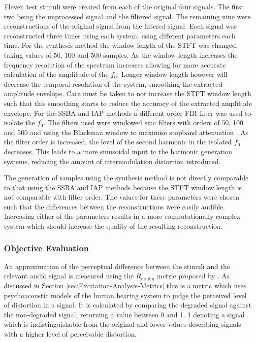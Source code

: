 			Eleven test stimuli were created from each of the original four signals. The first two being the
			unprocessed signal and the filtered signal. The remaining nine were reconstructions of the original
			signal from the filtered signal. Each signal was reconstructed three times using each system, using
			different parameters each time. For the synthesis method the window length of the STFT was changed,
			taking values of 50, 100 and 500 samples. As the window length increases the frequency resolution
			of the spectrum increases allowing for more accurate calculation of the amplitude of the $f_{0}$.
			Longer window length however will decrease the temporal resolution of the system, smoothing the
			extracted amplitude envelope. Care must be taken to not increase the STFT window length such that
			this smoothing starts to reduce the accuracy of the extracted amplitude envelope.  For the SSBA and
			IAP methods a different order FIR filter was used to isolate the $f_{0}$. The filters used were
			windowed sinc filters with orders of 50, 100 and 500 and using the Blackman window to maximise
			stopband attenuation \citep{schlichtharle2011digital}. As the filter order is increased, the
			level of the second harmonic in the isolated $f_{0}$ decreases. This leads to a more sinusoidal
			input to the harmonic generation systems, reducing the amount of intermodulation distortion
			introduced.

			The generation of samples using the synthesis method is not directly comparable to that using the
			SSBA and IAP methods because the STFT window length is not comparable with filter order. The values
			for these parameters were chosen such that the differences between the reconstructions were easily
			audible. Increasing either of the parameters results in a more computationally complex system which
			should increase the quality of the resulting reconstruction.

		\subsubsection*{Objective Evaluation}
			An approximation of the perceptual difference between the stimuli and the relevant audio signal is
			measured using the $R_{\mathrm{nonlin}}$ metric proposed by \citet{tan2004predicting}. As discussed
			in Section \ref{sec:Excitation-Analysis-Metrics} this is a metric which uses psychoacoustic models
			of the human hearing system to judge the perceived level of distortion in a signal. It is
			calculated by comparing the degraded signal against the non-degraded signal, returning a value
			between 0 and 1. 1 denoting a signal which is indistinguishable from the original and lower values
			describing signals with a higher level of perceivable distortion.

